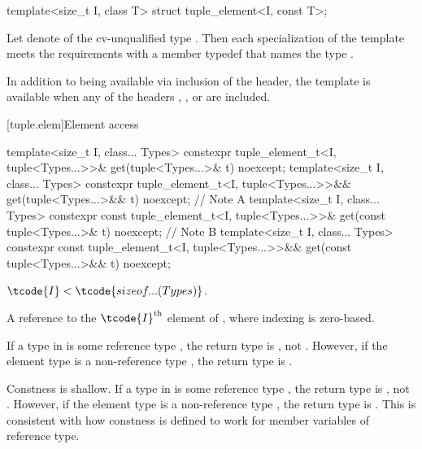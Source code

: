 %
\begin{itemdecl}
template<size_t I, class T> struct tuple_element<I, const T>;
\end{itemdecl}

\begin{itemdescr}
\pnum
Let  denote  of the cv-unqualified type . Then
each specialization of the template meets the  requirements
with a member typedef  that names the type .

\pnum
In addition to being available via inclusion of the  header,
the template is available
when any of the headers
,
, or
are included.
\end{itemdescr}

[tuple.elem]{Element access}

%
\begin{itemdecl}
template<size_t I, class... Types>
  constexpr tuple_element_t<I, tuple<Types...>>&
    get(tuple<Types...>& t) noexcept;
template<size_t I, class... Types>
  constexpr tuple_element_t<I, tuple<Types...>>&&
    get(tuple<Types...>&& t) noexcept;        // Note A
template<size_t I, class... Types>
  constexpr const tuple_element_t<I, tuple<Types...>>&
    get(const tuple<Types...>& t) noexcept;   // Note B
template<size_t I, class... Types>
  constexpr const tuple_element_t<I, tuple<Types...>>&& get(const tuple<Types...>&& t) noexcept;
\end{itemdecl}

\begin{itemdescr}
\pnum
\mandates
$\tcode{I} < \tcode{sizeof...(Types)}$.

\pnum
\returns
A reference to the $\tcode{I}^\text{th}$ element of , where
indexing is zero-based.

\pnum
\begin{note}
[Note A]
If a type  in  is some reference type ,
the return type is , not .
However, if the element type is a non-reference type ,
the return type is .
\end{note}

\pnum
\begin{note}
[Note B]
Constness is shallow.
If a type  in  is some reference type ,
the return type is , not .
However, if the element type is a non-reference type ,
the return type is .
This is consistent with how constness is defined to work
for member variables of reference type.
\end{note}
\end{itemdescr}

